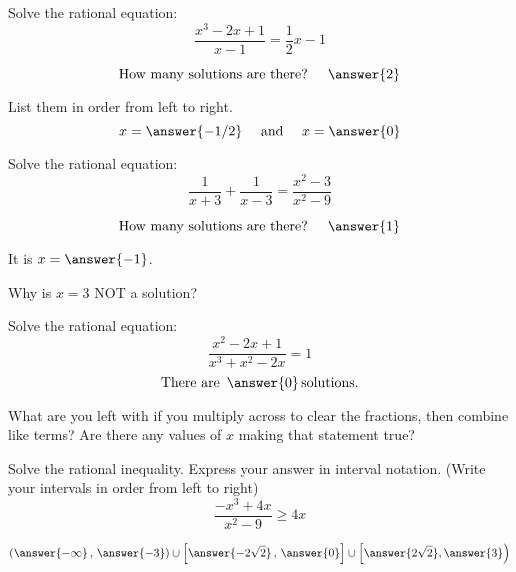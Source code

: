 \documentclass{ximera}
\author{Carl Stitz \and Jeff Zeager \and  Bobby Ramsey}
\begin{document}
\begin{exercise}
	Solve the rational equation:
	\[ \frac{x^3-2x+1}{x-1} = \frac{1}{2} x - 1 \]
	
	\[ \text{How many solutions are there? } \quad \answer{2} \]
	\begin{exercise}
		List them in order from left to right.
		\[ x = \answer{-1/2}  \quad \text{ and } \quad x=\answer{0} \]
	\end{exercise}
\end{exercise}


\begin{exercise}
	Solve the rational equation:
	\[ \frac{1}{x+3} + \frac{1}{x-3} = \frac{x^2-3}{x^2-9} \]
	
	\[ \text{How many solutions are there? } \quad \answer{1} \]
	\begin{exercise}
		It is $x = \answer{-1}$.
		\begin{exercise}
			Why is $x=3$ NOT a solution?
			\begin{multipleChoice}
			\end{multipleChoice}
		\end{exercise}
	\end{exercise}
\end{exercise}

\begin{exercise}
	Solve the rational equation:
	\[ \frac{x^2-2x+1}{x^3+x^2-2x} = 1 \]
	\[ \text{There are } \, \answer{0} \, \text{solutions.} \]
	\begin{feedback}
		What are you left with if you multiply across to clear the fractions, then combine like terms?  Are there any values of $x$ making that statement true?	
	\end{feedback}		
\end{exercise}

\begin{exercise}
	Solve the rational inequality.  Express your answer in interval notation.  (Write your intervals in order from left to right)
	\[ \frac{-x^3+4x}{x^2-9} \geq 4x  \]
	
	\[ \left( \answer{-\infty} \, , \, \answer{-3} \right) \cup \left[ \answer{-2\sqrt{2}} \, , \, \answer{0} \right] \cup \left[ \answer{2\sqrt{2}} , \answer{3} \right) \]
		
\end{exercise}
\end{document}
